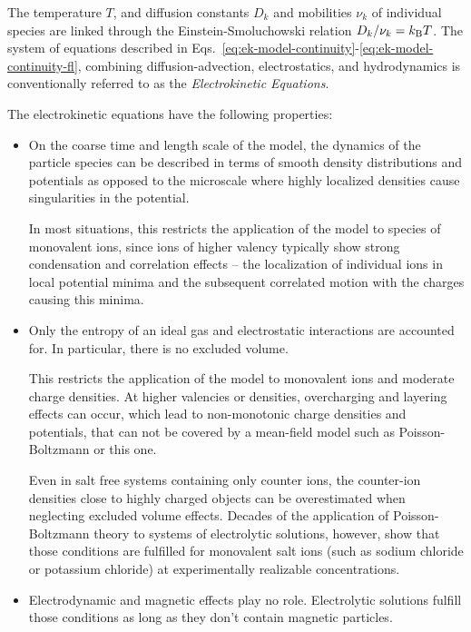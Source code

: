 The temperature $T$, and diffusion constants $D_k$ and mobilities $\nu_k$ of
individual species are linked through the Einstein-Smoluchowski relation $D_k /
\nu_k = k_\mathrm{B}T$. The system of equations described in
Eqs.~\eqref{eq:ek-model-continuity}-\eqref{eq:ek-model-continuity-fl}, combining 
diffusion-advection, electrostatics, and hydrodynamics is conventionally 
referred to as the \textit{Electrokinetic Equations}.


The electrokinetic equations have the following properties:
\begin{itemize}
\item On the coarse time and length scale of the model, the dynamics
  of the particle species can be described in terms of smooth density
  distributions and potentials as opposed to the microscale where
  highly localized densities cause singularities in the potential.
	
  In most situations, this restricts the application of the model to
  species of monovalent ions, since ions of higher valency typically
  show strong condensation and correlation effects -- the localization
  of individual ions in local potential minima and the subsequent
  correlated motion with the charges causing this minima.
	
\item Only the entropy of an ideal gas and electrostatic interactions
  are accounted for. In particular, there is no excluded volume.
	
  This restricts the application of the model to monovalent ions and
  moderate charge densities. At higher valencies or densities,
  overcharging and layering effects can occur, which lead to
  non-monotonic charge densities and potentials, that can not be
  covered by a mean-field model such as Poisson-Boltzmann or this one.
	
  Even in salt free systems containing only counter ions, the
  counter-ion densities close to highly charged objects can be
  overestimated when neglecting excluded volume effects. Decades of
  the application of Poisson-Boltzmann theory to systems of
  electrolytic solutions, however, show that those conditions are
  fulfilled for monovalent salt ions (such as sodium chloride or
  potassium chloride) at experimentally realizable concentrations.
	
\item Electrodynamic and magnetic effects play no role. Electrolytic
  solutions fulfill those conditions as long as they don't contain
  magnetic particles.
	

\end{itemize}
